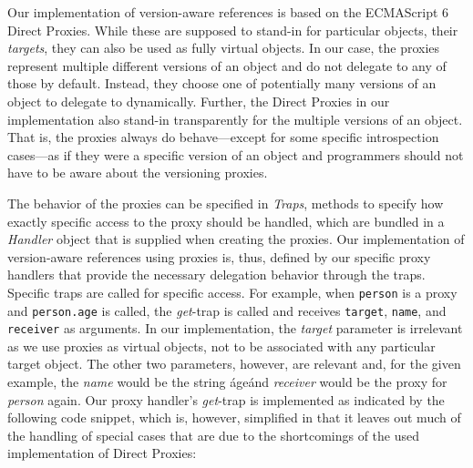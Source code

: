 Our implementation of version-aware references is based on the ECMAScript 6 Direct Proxies.
While these are supposed to stand-in for particular objects, their \emph{targets}, they can also be used as fully virtual objects.
In our case, the proxies represent multiple different versions of an object and do not delegate to any of those by default.
Instead, they choose one of potentially many versions of an object to delegate to dynamically.
Further, the Direct Proxies in our implementation also stand-in transparently for the multiple versions of an object.
That is, the proxies always do behave---except for some specific introspection cases---as if they were a specific version of an object and programmers should not have to be aware about the versioning proxies.

The behavior of the proxies can be specified in \emph{Traps}, methods to specify how exactly specific access to the proxy should be handled, which are bundled in a \emph{Handler} object that is supplied when creating the proxies.
Our implementation of version-aware references using proxies is, thus, defined by our specific proxy handlers that provide the necessary delegation behavior through the traps.
Specific traps are called for specific access. 
For example, when \lstinline{person} is a proxy and \lstinline{person.age} is called, the \emph{get}-trap is called and receives \lstinline{target}, \lstinline{name}, and \lstinline{receiver} as arguments.
In our implementation, the \emph{target} parameter is irrelevant as we use proxies as virtual objects, not to be associated with any particular target object.
The other two parameters, however, are relevant and, for the given example, the \emph{name} would be the string \'age\' and \emph{receiver} would be the proxy for \emph{person} again.
Our proxy handler's \emph{get}-trap is implemented as indicated by the following code snippet, which is, however, simplified in that it leaves out much of the handling of special cases that are due to the shortcomings of the used implementation of Direct Proxies:


\iffalse
\begin{verbatim}\fi
\begin{code}{}{}
get: function(dummyTarget, name, receiver) {

    var version = this.currentVersion();
    
    // proxy meta information and other special cases..
    if (name === 'isProxy') {
    // ...
    if (name === 'proxyTarget') {
    // ...
    
    result = version[name];
    
    return this.ensureProxied(result);
}
\end{code}
\iffalse
\end{verbatim}\fi

